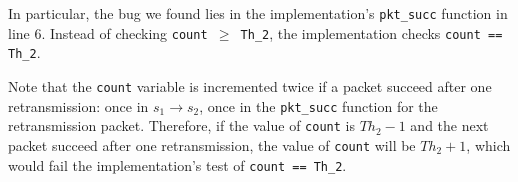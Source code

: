 In particular, the bug we found lies in the implementation's \texttt{pkt\_succ}
function in line 6. Instead of checking \texttt{count $\ge$ Th\_2}, the
implementation checks \texttt{count == Th\_2}.

Note that the \texttt{count} variable is incremented twice if a packet succeed
after one retransmission: once in $s_1\rightarrow s_2$, once in the
\texttt{pkt\_succ} function for the retransmission packet. Therefore, if the
value of \texttt{count} is $Th_2-1$ and the next packet succeed after one
retransmission, the value of \texttt{count} will be $Th_2+1$, which would fail
the implementation's test of \texttt{count == Th\_2}.
